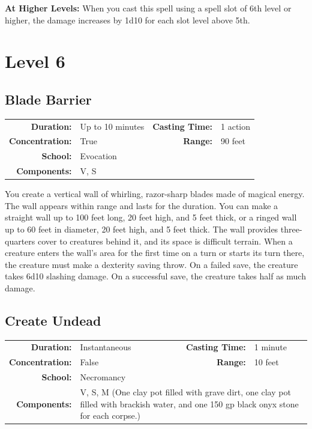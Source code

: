 \documentclass[12pt,showtrims]{memoir}
\begin{document}
\vspace{8pt} \noindent\textbf{At Higher Levels:} When you cast this spell using a spell slot of 6th level or higher, the damage increases by 1d10 for each slot level above 5th.
\newpage
\chapter*{Level 6} 
\section*{Blade Barrier}

{
\small\centering\vspace{-6pt}
\begin{tabular}{rlrl}
\toprule

\textbf{Duration:} & Up to 10 minutes &
\textbf{Casting Time:} & 1 action \\
\textbf{Concentration:} & True &
\textbf{Range:} & 90 feet \\
\textbf{School:} & Evocation \\
\textbf{Components:} & \multicolumn{3}{p{0.7\textwidth}}{V, S}\\

\bottomrule
\end{tabular}
}

\vspace{1\baselineskip}\noindent You create a vertical wall of whirling, razor-sharp blades made of magical energy. The wall appears within range and lasts for the duration. You can make a straight wall up to 100 feet long, 20 feet high, and 5 feet thick, or a ringed wall up to 60 feet in diameter, 20 feet high, and 5 feet thick. The wall provides three-quarters cover to creatures behind it, and its space is difficult terrain. When a creature enters the wall's area for the first time on a turn or starts its turn there, the creature must make a dexterity saving throw. On a failed save, the creature takes 6d10 slashing damage. On a successful save, the creature takes half as much damage.

\newpage
\section*{Create Undead}

{
\small\centering\vspace{-6pt}
\begin{tabular}{rlrl}
\toprule

\textbf{Duration:} & Instantaneous &
\textbf{Casting Time:} & 1 minute \\
\textbf{Concentration:} & False &
\textbf{Range:} & 10 feet \\
\textbf{School:} & Necromancy \\
\textbf{Components:} & \multicolumn{3}{p{0.7\textwidth}}{V, S, M (One clay pot filled with grave dirt, one clay pot filled with brackish water, and one 150 gp black onyx stone for each corpse.)}\\

\bottomrule
\end{tabular}
}
\end{document}
